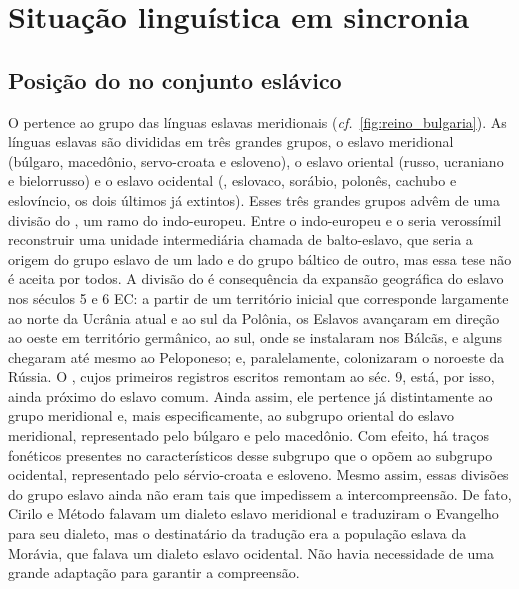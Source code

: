 
\section{Situação linguística em sincronia}

\subsection{Posição do  no conjunto eslávico}
O  pertence ao grupo das línguas eslavas
meridionais (\emph{cf.}~\autoref{fig:reino_bulgaria}).
As línguas eslavas são divididas em três grandes
grupos, o eslavo meridional (búlgaro, macedônio, servo-croata e esloveno), o
eslavo oriental (russo, ucraniano e bielorrusso) e o eslavo ocidental (,
eslovaco, sorábio, polonês, cachubo e eslovíncio, os dois últimos já
extintos). Esses três grandes grupos advêm de uma divisão do , um
ramo do indo-europeu. Entre o indo-europeu e o  seria verossímil
reconstruir uma unidade intermediária chamada de balto-eslavo, que seria a
origem do grupo eslavo de um lado e do grupo báltico de outro, mas essa tese
não é aceita por todos. A divisão do  é consequência da expansão
geográfica do eslavo nos séculos 5 e 6 EC\@: a partir de um território inicial
que corresponde largamente ao norte da Ucrânia atual e ao sul da Polônia, os
Eslavos avançaram em direção ao oeste em território germânico, ao sul, onde se
instalaram nos Bálcãs, e alguns chegaram até mesmo ao Peloponeso; e,
paralelamente, colonizaram o noroeste da Rússia. O , cujos primeiros
registros escritos remontam ao séc. 9, está, por isso, ainda próximo do eslavo
comum. Ainda assim, ele pertence já distintamente ao grupo meridional e, mais
especificamente, ao subgrupo oriental do eslavo meridional, representado pelo
búlgaro e pelo macedônio. Com efeito, há traços fonéticos presentes no 
característicos desse subgrupo que o opõem ao subgrupo ocidental, representado
pelo sérvio-croata e esloveno. Mesmo assim, essas divisões do grupo eslavo
ainda não eram tais que impedissem a intercompreensão. De fato, Cirilo e
Método falavam um dialeto eslavo meridional e traduziram o Evangelho para seu
dialeto, mas o destinatário da tradução era a população eslava da Morávia, que
falava um dialeto eslavo ocidental. Não havia necessidade de uma grande
adaptação para garantir a compreensão.

